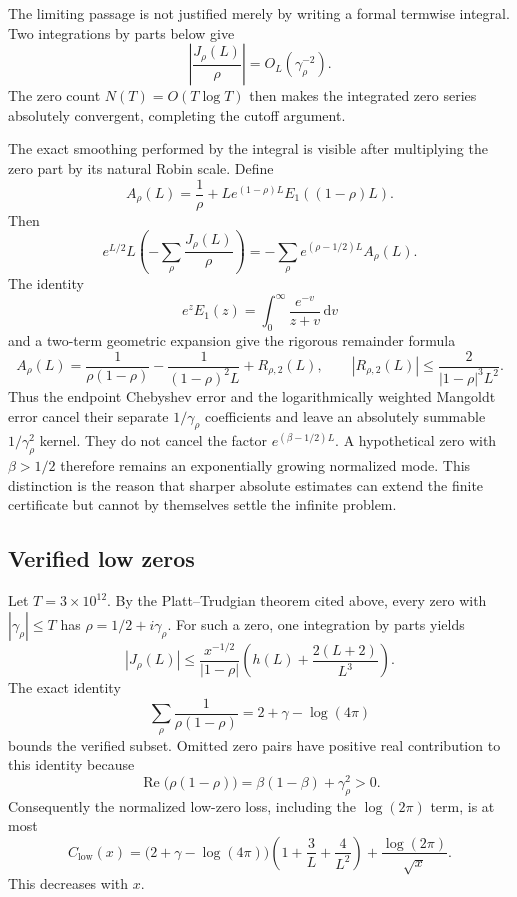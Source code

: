 \documentclass[11pt,a4paper]{article}
\numberwithin{equation}{section}
\theoremstyle{definition}
\newcommand{\dd}{\,\mathrm{d}}
\begin{document}
The limiting passage is not justified merely by writing a formal termwise
integral.  Two integrations by parts below give
\[
  \left|\frac{J_\rho(L)}\rho\right|
  =O_L(\gamma_\rho^{-2}).
\]
The zero count \(N(T)=O(T\log T)\) then makes the integrated zero series
absolutely convergent, completing the cutoff argument.

The exact smoothing performed by the integral is visible after multiplying
the zero part by its natural Robin scale.  Define
\[
  A_\rho(L)
  =\frac1\rho
  +Le^{(1-\rho)L}E_1((1-\rho)L).
\]
Then
\begin{equation}\label{eq:normalized-zero-kernel}
  e^{L/2}L\left(-\sum_\rho\frac{J_\rho(L)}\rho\right)
  =-\sum_\rho e^{(\rho-1/2)L}A_\rho(L).
\end{equation}
The identity
\[
  e^zE_1(z)=\int_0^\infty\frac{e^{-v}}{z+v}\dd v
\]
and a two-term geometric expansion give the rigorous remainder formula
\begin{equation}\label{eq:Arho-expansion}
  \boxed{
  A_\rho(L)
  =\frac1{\rho(1-\rho)}
  -\frac1{(1-\rho)^2L}+R_{\rho,2}(L),
  \qquad
  |R_{\rho,2}(L)|
  \le\frac2{|1-\rho|^3L^2}.
  }
\end{equation}
Thus the endpoint Chebyshev error and the logarithmically weighted Mangoldt
error cancel their separate \(1/\gamma_\rho\) coefficients and leave an
absolutely summable \(1/\gamma_\rho^2\) kernel.  They do not cancel the factor
\(e^{(\beta-1/2)L}\).  A hypothetical zero with \(\beta>1/2\) therefore
remains an exponentially growing normalized mode.  This distinction is the
reason that sharper absolute estimates can extend the finite certificate but
cannot by themselves settle the infinite problem.

\subsection{Verified low zeros}

Let \(T=3\times10^{12}\).  By the Platt--Trudgian theorem cited above, every
zero with \(|\gamma_\rho|\le T\) has
\(\rho=1/2+i\gamma_\rho\).  For such a zero, one integration by parts yields
\[
  |J_\rho(L)|
  \le
  \frac{x^{-1/2}}{|1-\rho|}
  \left(
  h(L)+\frac{2(L+2)}{L^3}
  \right).
\]
The exact identity
\[
  \sum_\rho\frac1{\rho(1-\rho)}
  =
  2+\gamma-\log(4\pi)
\]
bounds the verified subset.  Omitted zero pairs have positive real
contribution to this identity because
\[
  \operatorname{Re}\bigl(\rho(1-\rho)\bigr)
  =
  \beta(1-\beta)+\gamma_\rho^2>0.
\]
Consequently the normalized low-zero loss, including the
\(\log(2\pi)\) term, is at most
\begin{equation}\label{eq:low-zero-loss}
  C_{\mathrm{low}}(x)
  =
  \bigl(2+\gamma-\log(4\pi)\bigr)
  \left(1+\frac3L+\frac4{L^2}\right)
  +\frac{\log(2\pi)}{\sqrt{x}}.
\end{equation}
This decreases with \(x\).
\end{document}
